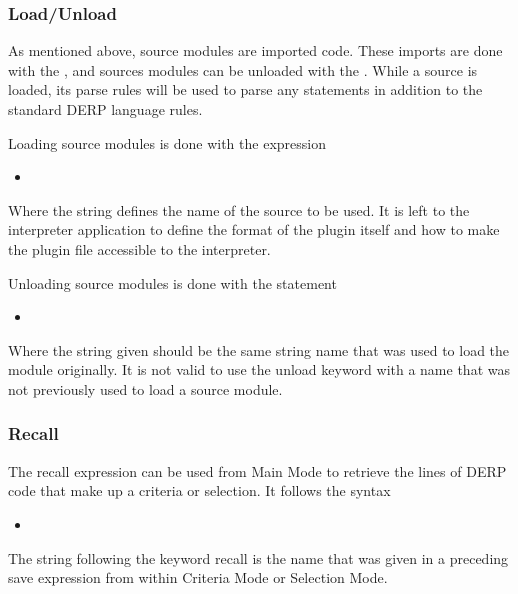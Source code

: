 \subsubsection{Load/Unload}
As mentioned above, source modules are imported code. These imports are done with the ,
and sources modules can be unloaded with the . While a source is loaded, its parse
rules will be used to parse any statements in addition to the standard DERP language rules.

Loading source modules is done with the expression
\begin{itemize}[leftmargin=2in]
    \item[\nonterminal{load\_expression}] \bnf{:}  
\end{itemize}

Where the string defines the name of the source to be used. It is left to the interpreter application to define
the format of the plugin itself and how to make the plugin file accessible to the interpreter.

Unloading source modules is done with the statement
\begin{itemize}[leftmargin=2in]
    \item[\nonterminal{unload\_expression}] \bnf{:}  
\end{itemize}

Where the string given should be the same string name that was used to load the module originally.
It is not valid to use the unload keyword with a name that was not previously used to load a source module.



\subsubsection{Recall}
The recall expression can be used from Main Mode to retrieve the lines of DERP code that make up a
criteria or selection. It follows the syntax
\begin{itemize}[leftmargin=2in]
    \item[\nonterminal{recall\_expression}] \bnf{:}  
\end{itemize}

The string following the keyword recall is the name that was given in a preceding save expression from
within Criteria Mode or Selection Mode.

